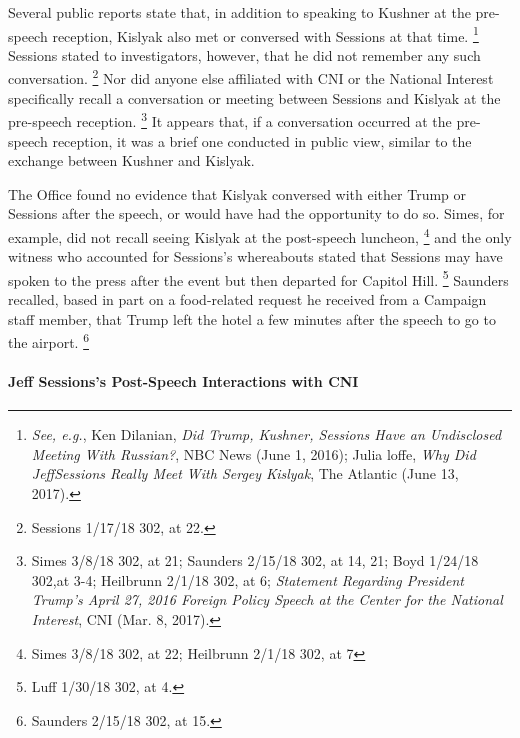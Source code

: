 Several public reports state that, in addition to speaking to Kushner at the pre-speech reception, Kislyak also met or conversed with Sessions at that time.%
\footnote{\textit{See, e.g.}, Ken Dilanian, \textit{Did Trump, Kushner, Sessions Have an Undisclosed Meeting With Russian?}, NBC News (June 1, 2016);
Julia loffe, \textit{Why Did JeffSessions Really Meet With Sergey Kislyak}, The Atlantic (June 13, 2017).}
Sessions stated to investigators, however, that he did not remember any such conversation.%
\footnote{Sessions 1/17/18 302, at 22.}
Nor did anyone else affiliated with CNI or the National Interest specifically recall a conversation or meeting between Sessions and Kislyak at the pre-speech reception.%
\footnote{Simes 3/8/18 302, at 21;
Saunders 2/15/18 302, at 14, 21;
Boyd 1/24/18 302,at 3-4;
Heilbrunn 2/1/18 302, at 6;
\textit{Statement Regarding President Trump’s April 27, 2016 Foreign Policy Speech at the Center for the National Interest}, CNI (Mar. 8, 2017).}
It appears that, if a conversation occurred at the pre-speech reception, it was a brief one conducted in public view, similar to the exchange between Kushner and Kislyak.

The Office found no evidence that Kislyak conversed with either Trump or Sessions after the speech, or would have had the opportunity to do so.
Simes, for example, did not recall seeing Kislyak at the post-speech luncheon,%
\footnote{Simes 3/8/18 302, at 22;
Heilbrunn 2/1/18 302, at 7}
and the only witness who accounted for Sessions's whereabouts stated that Sessions may have spoken to the press after the event but then departed for Capitol Hill.%
\footnote{Luff 1/30/18 302, at 4.}
Saunders recalled, based in part on a food-related request he received from a Campaign staff member, that Trump left the hotel a few minutes after the speech to go to the airport.%
\footnote{Saunders 2/15/18 302, at 15.}

\paragraph{Jeff Sessions's Post-Speech Interactions with CNI}

